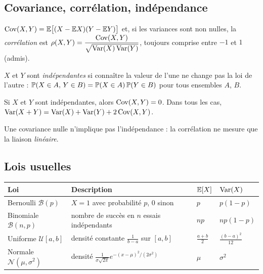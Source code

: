 \subsection{Covariance, corrélation, indépendance}

\begin{definition}
$\Cov(X,Y)=\E\big[(X-\E X)(Y-\E Y)\big]$ et, si les variances sont non nulles, la \emph{corrélation} est
$\rho(X,Y)=\dfrac{\Cov(X,Y)}{\sqrt{\Var(X)\Var(Y)}}$, toujours comprise entre $-1$ et $1$ (admis).
\end{definition}

\begin{definition}[Indépendance]
$X$ et $Y$ sont \emph{indépendantes} si connaître la valeur de l'une ne change pas la loi de l'autre : $\P(X\in A,\,Y\in B)=\P(X\in A)\,\P(Y\in B)$ pour tous ensembles $A$, $B$.
\end{definition}

\begin{proposition}[admise]
\label{prop:indep}
Si $X$ et $Y$ sont indépendantes, alors $\Cov(X,Y)=0$. Dans tous les cas, $\Var(X+Y)=\Var(X)+\Var(Y)+2\Cov(X,Y)$.
\end{proposition}

\begin{remarque}
Une covariance nulle n'implique pas l'indépendance : la corrélation ne mesure que la liaison \emph{linéaire}.
\end{remarque}

\subsection{Lois usuelles}

\begin{center}
\renewcommand{\arraystretch}{1.3}
\begin{tabular}{llll}
\toprule
\textbf{Loi} & \textbf{Description} & $\E[X]$ & $\Var(X)$ \\
\midrule
Bernoulli $\mathcal B(p)$ & $X=1$ avec probabilité $p$, $0$ sinon & $p$ & $p(1-p)$ \\
Binomiale $\mathcal B(n,p)$ & nombre de succès en $n$ essais indépendants & $np$ & $np(1-p)$ \\
Uniforme $\mathcal U[a,b]$ & densité constante $\frac{1}{b-a}$ sur $[a,b]$ & $\frac{a+b}{2}$ & $\frac{(b-a)^2}{12}$ \\
Normale $\mathcal N(\mu,\sigma^2)$ & densité $\frac{1}{\sigma\sqrt{2\pi}}e^{-(x-\mu)^2/(2\sigma^2)}$ & $\mu$ & $\sigma^2$ \\
\bottomrule
\end{tabular}
\end{center}

